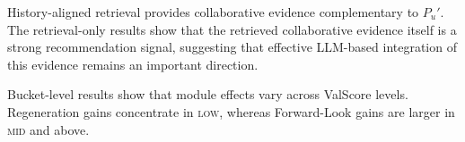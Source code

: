 \documentclass[11pt]{article}
\begin{document}
History-aligned retrieval provides collaborative evidence complementary to $P_u'$. The retrieval-only results show that the retrieved collaborative evidence itself is a strong recommendation signal, suggesting that effective LLM-based integration of this evidence remains an important direction.

Bucket-level results show that module effects vary across ValScore levels. Regeneration gains concentrate in \textsc{low}, whereas Forward-Look gains are larger in \textsc{mid} and above.




\end{document}
